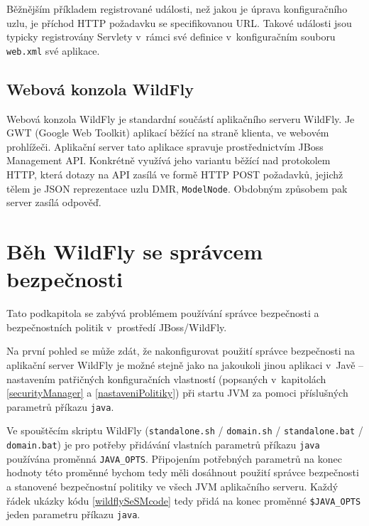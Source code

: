 Běžnějším příkladem registrované události, než jakou je úprava konfiguračního uzlu, je příchod HTTP požadavku se specifikovanou URL.
Takové události jsou typicky registrovány Servlety v~rámci své definice v~konfiguračním souboru {\tt web.xml} své aplikace.
\cite{jboss7slideShare}

\subsection{Webová konzola WildFly} \label{hal}

Webová konzola WildFly je standardní součástí aplikačního serveru WildFly.
Je GWT (Google Web Toolkit) aplikací běžící na straně klienta, ve webovém prohlížeči.
Aplikační server tato aplikace spravuje prostřednictvím JBoss Management API.
Konkrétně využívá jeho variantu běžící nad protokolem HTTP, která dotazy na API zasílá ve formě HTTP POST požadavků, jejichž tělem je JSON reprezentace uzlu DMR, {\tt ModelNode}. Obdobným způsobem pak server zasílá odpověď.
\cite{WildFlyManagementAPIreference}

\section{Běh WildFly se správcem bezpečnosti} \label{wildflySeSM}

Tato podkapitola se zabývá problémem používání správce bezpečnosti a bezpečnostních politik v~prostředí JBoss/WildFly.

Na první pohled se může zdát, že nakonfigurovat použití správce bezpečnosti na aplikační server WildFly je možné stejně jako na jakoukoli jinou aplikaci v~Javě -- nastavením patřičných konfiguračních vlastností (popsaných v~kapitolách \ref{securityManager} a \ref{nastaveniPolitiky}) při startu JVM za pomoci příslušných parametrů příkazu {\tt java}.

Ve spouštěcím skriptu WildFly ({\tt standalone.sh} / {\tt domain.sh} / {\tt standalone.bat} / {\tt domain.bat}) je pro potřeby přidávání vlastních parametrů příkazu {\tt java} používána proměnná {\tt JAVA\_OPTS}.
Připojením potřebných parametrů na konec hodnoty této proměnné bychom tedy měli dosáhnout použití správce bezpečnosti a stanovené bezpečnostní politiky ve všech JVM aplikačního serveru. Každý řádek ukázky kódu \ref{wildflySeSMcode} tedy přidá na konec proměnné {\tt \$JAVA\_OPTS} jeden parametru příkazu {\tt java}. \cite{jbossSecurityManager}

